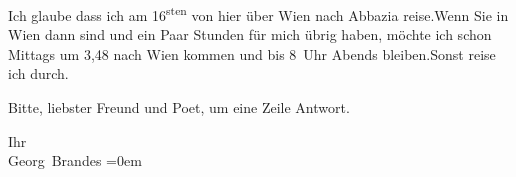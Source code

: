 \pstart
           Ich glaube dass ich am 16\textsuperscript{sten} von hier über Wien nach Abbazia reise.\hspace*{1.5em}Wenn Sie in Wien dann sind und ein Paar Stunden
               für mich übrig haben, möchte ich schon Mittags um 3,48 nach Wien kommen und bis 8 Uhr Abends
                  bleiben.\hspace*{1.5em}Sonst reise ich durch.\pend
           
\pstart
           Bitte, liebster Freund und Poet, um eine Zeile Antwort.\pend
           
\pstart
           Ihr{\\[\baselineskip]}\spacefill\mbox{Georg Brandes}\pend
           \leftskip=0em{}\endnumbering{}  
      